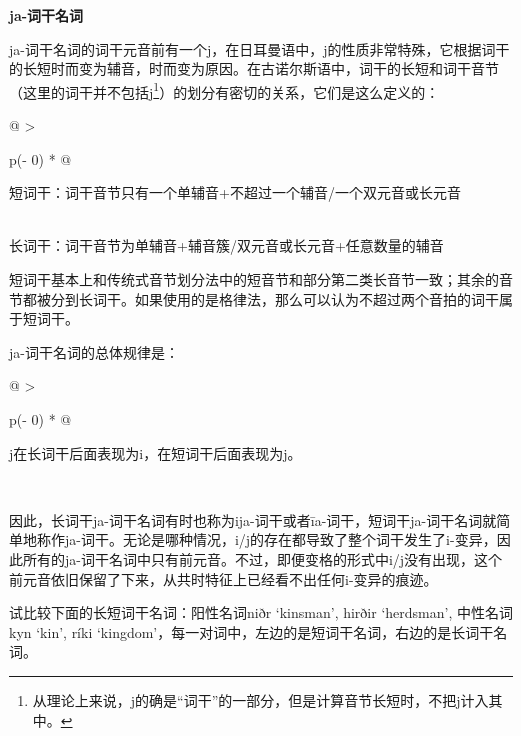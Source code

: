 \textbf{ja-词干名词}

ja-词干名词的词干元音前有一个j，在日耳曼语中，j的性质非常特殊，它根据词干的长短时而变为辅音，时而变为原因。在古诺尔斯语中，词干的长短和词干音节（这里的词干并不包括j\footnote{从理论上来说，j的确是``词干''的一部分，但是计算音节长短时，不把j计入其中。}）的划分有密切的关系，它们是这么定义的：

\begin{longtable}[]{@{}
  >{\raggedright\arraybackslash}p{(\columnwidth - 0\tabcolsep) * }@{}}
\toprule\noalign{}
\begin{minipage}[b]{\linewidth}\raggedright
短词干：词干音节只有一个单辅音+不超过一个辅音/一个双元音或长元音
\end{minipage} \\
\midrule\noalign{}
\endhead
\bottomrule\noalign{}
\endlastfoot
长词干：词干音节为单辅音+辅音簇/双元音或长元音+任意数量的辅音 \\
\end{longtable}

短词干基本上和传统式音节划分法中的短音节和部分第二类长音节一致；其余的音节都被分到长词干。如果使用的是格律法，那么可以认为不超过两个音拍的词干属于短词干。

ja-词干名词的总体规律是：

\begin{longtable}[]{@{}
  >{\raggedright\arraybackslash}p{(\columnwidth - 0\tabcolsep) * }@{}}
\toprule\noalign{}
\begin{minipage}[b]{\linewidth}\raggedright
j在长词干后面表现为i，在短词干后面表现为j。
\end{minipage} \\
\midrule\noalign{}
\endhead
\bottomrule\noalign{}
\endlastfoot
\end{longtable}

因此，长词干ja-词干名词有时也称为ija-词干或者īa-词干，短词干ja-词干名词就简单地称作ja-词干。无论是哪种情况，i/j的存在都导致了整个词干发生了i-变异，因此所有的ja-词干名词中只有前元音。不过，即便变格的形式中i/j没有出现，这个前元音依旧保留了下来，从共时特征上已经看不出任何i-变异的痕迹。

试比较下面的长短词干名词：阳性名词niðr `kinsman', hirðir `herdsman',
中性名词kyn `kin', ríki
`kingdom'，每一对词中，左边的是短词干名词，右边的是长词干名词。

